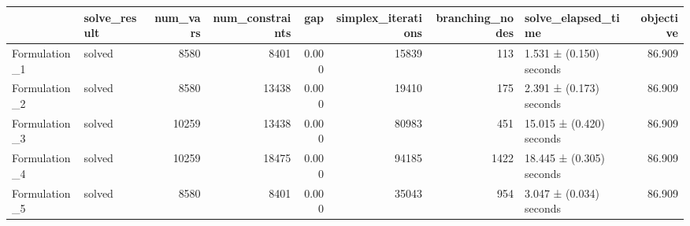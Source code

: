 \begin{tabular}{llrrrrrlr}
\toprule
 & solve_result & num_vars & num_constraints & gap & simplex_iterations & branching_nodes & solve_elapsed_time & objective \\
\midrule
Formulation_1 & solved & 8580 & 8401 & 0.000 & 15839 & 113 & 1.531 ± (0.150) seconds & 86.909 \\
Formulation_2 & solved & 8580 & 13438 & 0.000 & 19410 & 175 & 2.391 ± (0.173) seconds & 86.909 \\
Formulation_3 & solved & 10259 & 13438 & 0.000 & 80983 & 451 & 15.015 ± (0.420) seconds & 86.909 \\
Formulation_4 & solved & 10259 & 18475 & 0.000 & 94185 & 1422 & 18.445 ± (0.305) seconds & 86.909 \\
Formulation_5 & solved & 8580 & 8401 & 0.000 & 35043 & 954 & 3.047 ± (0.034) seconds & 86.909 \\
\bottomrule
\end{tabular}
